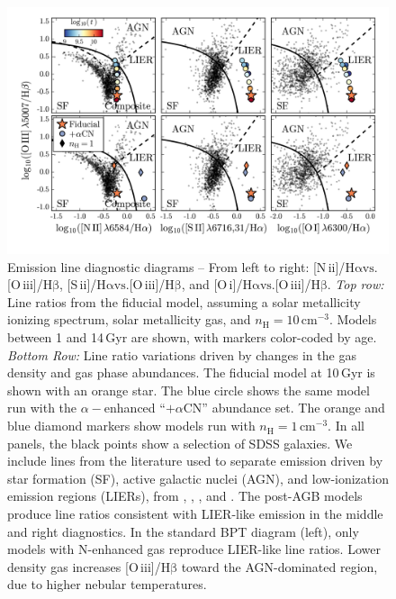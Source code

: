 \documentclass[preprint2]{aastex62}
\newcommand\vs{\ensuremath{\mathrm{vs.}}\xspace}
\newcommand{\nii}{[N\,{\sc ii}]\xspace}
\newcommand{\sii}{[S\,{\sc ii}]\xspace}
\newcommand{\oiii}{[O\,{\sc iii}]\xspace}
\newcommand{\oi}{[O\,{\sc i}]\xspace}
\newcommand{\ha}{\ensuremath{\mathrm{H\alpha}}\xspace}
\newcommand{\hb}{\ensuremath{\mathrm{H\beta}}\xspace}
\newcommand{\Gyr}{$\,$Gyr\xspace}
\newcommand{\alphaCN}{\ensuremath{+\alpha\mathrm{CN}}\xspace}
\begin{document}
\begin{figure}[ht]
  \begin{center}
    \includegraphics[width=\linewidth]{figs/f5.png}
    \caption{{\sc Emission line diagnostic diagrams --} From left to right: \nii/\ha \vs \oiii/\hb, \sii/\ha \vs \oiii/\hb, and  \oi/\ha \vs \oiii/\hb. \emph{Top row:} Line ratios from the fiducial model, assuming a solar metallicity ionizing spectrum, solar metallicity gas, and $n_{\mathrm{H}}=10$\,cm$^{-3}$. Models between 1 and 14\Gyr are shown, with markers color-coded by age. \emph{Bottom Row:} Line ratio variations driven by changes in the gas density and gas phase abundances. The fiducial model at 10\Gyr is shown with an orange star. The blue circle shows the same model run with the $\alpha-$enhanced ``\alphaCN'' abundance set. The orange and blue diamond markers show models run with $n_{\mathrm{H}}=1$\,cm$^{-3}$. In all panels, the black points show a selection of SDSS galaxies. We include lines from the literature used to separate emission driven by star formation (SF), active galactic nuclei (AGN), and low-ionization emission regions (LIERs), from \citet{Kewley+2001}, \citet{Kauffmann+2003b}, \citet{Kewley+2006}, and \citet{CidFernandes+2010}. The post-AGB models produce line ratios consistent with LIER-like emission in the middle and right diagnostics. In the standard BPT diagram (left), only models with N-enhanced gas reproduce LIER-like line ratios. Lower density gas increases \oiii/\hb toward the AGN-dominated region, due to higher nebular temperatures.}
    \label{fig:BPT}
  \end{center}
\end{figure}
\end{document}
